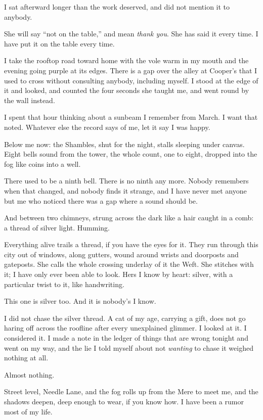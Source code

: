 I sat afterward longer than the work deserved, and did not mention it to anybody.

She will say ``not on the table,'' and mean \emph{thank you}. She has said it every time. I have put it on the table every time.

I take the rooftop road toward home with the vole warm in my mouth and the evening going purple at its edges. There is a gap over the alley at Cooper's that I used to cross without consulting anybody, including myself. I stood at the edge of it and looked, and counted the four seconds she taught me, and went round by the wall instead.

I spent that hour thinking about a sunbeam I remember from March. I want that noted. Whatever else the record says of me, let it say I was happy.

\scenebreak

Below me now: the Shambles, shut for the night, stalls sleeping under canvas. Eight bells sound from the tower, the whole count, one to eight, dropped into the fog like coins into a well.

There used to be a ninth bell. There is no ninth any more. Nobody remembers when that changed, and nobody finds it strange, and I have never met anyone but me who noticed there was a gap where a sound should be.

And between two chimneys, strung across the dark like a hair caught in a comb: a thread of silver light. Humming.

Everything alive trails a thread, if you have the eyes for it. They run through this city out of windows, along gutters, wound around wrists and doorposts and gateposts. She calls the whole crossing underlay of it the Weft. She stitches with it; I have only ever been able to look. Hers I know by heart: silver, with a particular twist to it, like handwriting.

This one is silver too. And it is nobody's I know.

I did not chase the silver thread. A cat of my age, carrying a gift, does not go haring off across the roofline after every unexplained glimmer. I looked at it. I considered it. I made a note in the ledger of things that are wrong tonight and went on my way, and the lie I told myself about not \emph{wanting} to chase it weighed nothing at all.

Almost nothing.

\scenebreak

Street level, Needle Lane, and the fog rolls up from the Mere to meet me, and the shadows deepen, deep enough to wear, if you know how. I have been a rumor most of my life.

